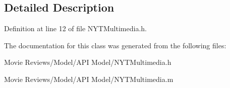 \subsection{Detailed Description}


Definition at line 12 of file N\+Y\+T\+Multimedia.\+h.



The documentation for this class was generated from the following files\+:\begin{DoxyCompactItemize}
\item 
Movie Reviews/\+Model/\+A\+P\+I Model/N\+Y\+T\+Multimedia.\+h\item 
Movie Reviews/\+Model/\+A\+P\+I Model/N\+Y\+T\+Multimedia.\+m\end{DoxyCompactItemize}

